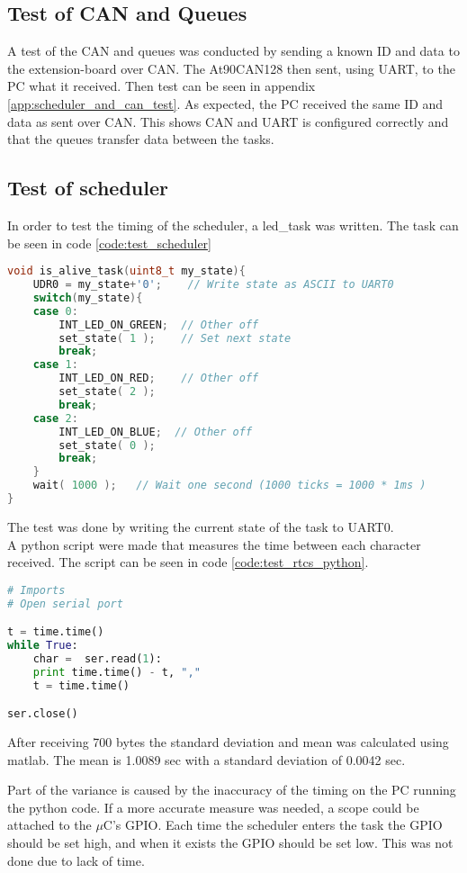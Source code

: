 \subsection*{Test of CAN and Queues}
A test of the CAN and queues was conducted by sending a known ID and data to the extension-board over \ac{CAN}. The At90CAN128 then sent, using UART, to the PC what it received. Then test can be seen in appendix \ref{app:scheduler_and_can_test}.
As expected, the PC received the same ID and data as sent over CAN. This shows CAN and UART is configured correctly and that the queues transfer data between the tasks.
\subsection*{Test of scheduler}
%
In order to test the timing of the scheduler, a led\_task was written. The task can be seen in code \ref{code:test_scheduler}
\begin{lstlisting}[language = c, caption = RTCS task used in timing test, label=code:test_scheduler]
void is_alive_task(uint8_t my_state){
	UDR0 = my_state+'0'; 	// Write state as ASCII to UART0
	switch(my_state){
	case 0:
		INT_LED_ON_GREEN;  // Other off
	    set_state( 1 );    // Set next state
		break;
	case 1:
		INT_LED_ON_RED;    // Other off
	    set_state( 2 );
		break;
	case 2:
		INT_LED_ON_BLUE;  // Other off
	    set_state( 0 );
		break;
	}
	wait( 1000 ); 	// Wait one second (1000 ticks = 1000 * 1ms )
}
\end{lstlisting}

The test was done by writing the current state of the task to UART0.\\ A python script were made that measures the time between each character received. The script can be seen in code \ref{code:test_rtcs_python}.
\begin{lstlisting}[language = python, caption = Python code used to measure time between received byte, label=code:test_rtcs_python]
# Imports
# Open serial port

t = time.time()
while True:
    char =  ser.read(1):
    print time.time() - t, ","
    t = time.time()

ser.close()
\end{lstlisting}
After receiving 700 bytes the standard deviation and mean was calculated using matlab.
The mean is 1.0089 sec with a standard deviation of 0.0042 sec.

Part of the variance is caused by the inaccuracy of the timing on the PC running the python code. If a more accurate measure was needed, a scope could be attached to the $\mu$C's GPIO. Each time the scheduler enters the task the GPIO should be set high, and when it exists the GPIO should be set low. This was not done due to lack of time.




